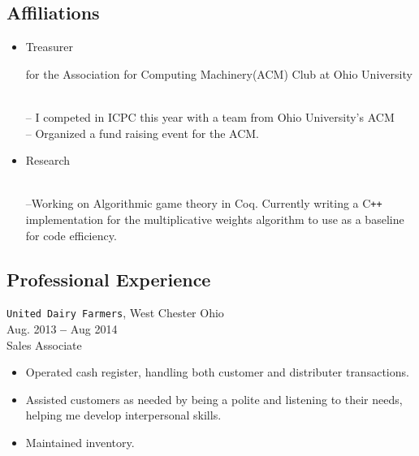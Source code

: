 \documentclass[11pt]{article} %
\begin{document}
\subsection*{Affiliations}
\begin{itemize}
\item{\begin{bf}Treasurer\end{bf} for the Association for Computing Machinery(ACM) Club at Ohio University}\\
-- I competed in ICPC this year with a team from Ohio University's ACM \\
-- Organized a fund raising event for the ACM.
\item{\begin{bf}Research\end{bf} }\\--Working on Algorithmic game theory in Coq.  Currently writing a C\texttt{++} implementation for the multiplicative weights algorithm to use as a baseline for code efficiency.
\end{itemize}


\subsection*{Professional Experience}
\texttt{United Dairy Farmers}, West Chester Ohio\\
Aug. 2013 \textbf{--} Aug 2014\\
Sales Associate
\begin{itemize}
\item{Operated cash register, handling both customer and distributer transactions.}
\item{ Assisted customers as needed by being a polite and listening to their needs, helping me develop interpersonal skills.}
\item{ Maintained inventory.}
\end{itemize}

           
\end{document}
